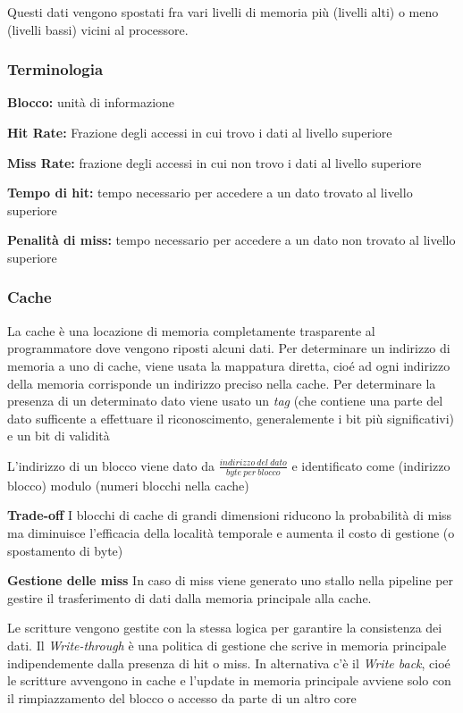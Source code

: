 \documentclass[12pt, a4paper]{article}
\begin{document}
Questi dati vengono spostati fra vari livelli di memoria più (livelli alti) o meno (livelli bassi) vicini al
processore.

\subsubsection{Terminologia}
\textbf{Blocco:} unità di informazione

\textbf{Hit Rate:} Frazione degli accessi in cui trovo i dati al livello superiore

\textbf{Miss Rate:} frazione degli accessi in cui non trovo i dati al livello superiore

\textbf{Tempo di hit:} tempo necessario per accedere a un dato trovato al livello superiore

\textbf{Penalità di miss:} tempo necessario per accedere a un dato non trovato al livello superiore

\subsubsection{Cache}
La cache è una locazione di memoria completamente trasparente al programmatore dove vengono riposti alcuni dati.
Per determinare un indirizzo di memoria a uno di cache, viene usata la mappatura diretta, cioé ad ogni indirizzo 
della memoria corrisponde un indirizzo preciso nella cache. Per determinare la presenza di un determinato dato viene 
usato un \textit{tag} (che contiene una parte del dato sufficente a effettuare il riconoscimento, generalemente i 
bit più significativi) e un bit di validità

L'indirizzo di un blocco viene dato da $\frac{indirizzo\ del\ dato}{byte\ per\ blocco}$ e identificato come 
(indirizzo blocco) modulo (numeri blocchi nella cache)

\textbf{Trade-off}
I blocchi di cache di grandi dimensioni riducono la probabilità di miss ma diminuisce l'efficacia della località
temporale e aumenta il costo di gestione (o spostamento di byte)

\textbf{Gestione delle miss}
In caso di miss viene generato uno stallo nella pipeline per gestire il trasferimento di dati dalla memoria principale
alla cache.

Le scritture vengono gestite con la stessa logica per garantire la consistenza dei dati. Il \textit{Write-through}
è una politica di gestione che scrive in memoria principale indipendemente dalla presenza di hit o miss. In 
alternativa c'è il \textit{Write back}, cioé le scritture avvengono in cache e l'update in memoria principale avviene
solo con il rimpiazzamento del blocco o accesso da parte di un altro core
\end{document}
